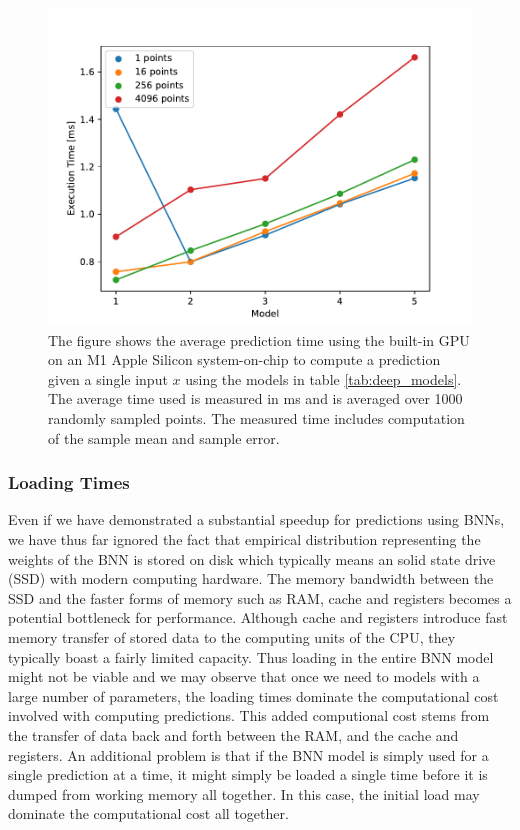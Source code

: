 \begin{figure}[h!]
    \centering
    \includegraphics[scale=0.7]{figures/prediction_time/prediction_time_gpu.pdf}
    \caption{The figure shows the average prediction time using the built-in GPU on an M1 Apple Silicon system-on-chip to compute a prediction given a single input $x$ using the models in table \ref{tab:deep_models}. The average time used is measured in ms and is averaged over 1000 randomly sampled points. The measured time includes computation of the sample mean and sample error. 
    }
    \label{fig:prediction_time_gpu}
\end{figure}

\subsubsection{Loading Times}
Even if we have demonstrated a substantial speedup for predictions using BNNs, we have thus far ignored the fact that empirical distribution representing the weights of the BNN is stored on disk which typically means an solid state drive (SSD) with modern computing hardware. The memory bandwidth between the SSD and the faster forms of memory such as RAM, cache and registers becomes a potential bottleneck for performance. Although cache and registers introduce fast memory transfer of stored data to the computing units of the CPU, they typically boast a fairly limited capacity. Thus loading in the entire BNN model might not be viable and we may observe that once we need to models with a large number of parameters, the loading times dominate the computational cost involved with computing predictions. This added computional cost stems from the transfer of data back and forth between the RAM, and the cache and registers. An additional problem is that if the BNN model is simply used for a single prediction at a time, it might simply be loaded a single time before it is dumped from working memory all together. In this case, the initial load may dominate the computational cost all together. 

